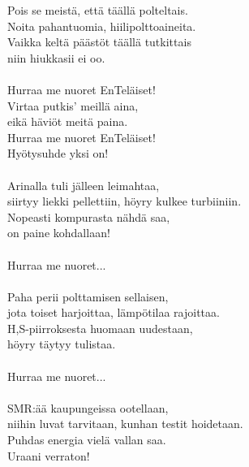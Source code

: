 
            Pois se meistä, että täällä polteltais. \\
            Noita pahantuomia, hiilipolttoaineita. \\
            Vaikka keltä päästöt täällä tutkittais \\
            niin hiukkasii ei oo. \\
\hspace{10mm} \\
            Hurraa me nuoret EnTeläiset! \\
            Virtaa putkis' meillä aina, \\
            eikä häviöt meitä paina. \\
            Hurraa me nuoret EnTeläiset! \\
            Hyötysuhde yksi on! \\
\hspace{10mm} \\
            Arinalla tuli jälleen leimahtaa, \\
            siirtyy liekki pellettiin, höyry kulkee turbiiniin. \\
            Nopeasti kompurasta nähdä saa, \\
            on paine kohdallaan! \\
\hspace{10mm} \\
            Hurraa me nuoret... \\
\hspace{10mm} \\
            Paha perii polttamisen sellaisen, \\
            jota toiset harjoittaa, lämpötilaa rajoittaa. \\
            H,S-piirroksesta huomaan uudestaan, \\
            höyry täytyy tulistaa. \\
\hspace{10mm} \\
            Hurraa me nuoret... \\
\hspace{10mm} \\
            SMR:ää kaupungeissa ootellaan, \\
            niihin luvat tarvitaan, kunhan testit hoidetaan. \\
            Puhdas energia vielä vallan saa. \\
            Uraani verraton! \\
